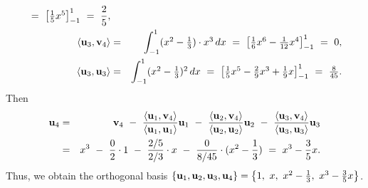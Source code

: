 \begin{solution}
\begin{eqnarray*}
    ~=~ \bigbracket{\textstyle\frac{1}{5}x^5}_{-1}^{1}
    ~=~ \frac{2}{5},
    \\
    \iprod{\vect{u}_3,\vect{v}_4}
    &=& \int_{-1}^{1}\textstyle (x^2-\frac{1}{3})\cdot x^3\,dx
    ~=~ \bigbracket{\textstyle\frac{1}{6}x^6 - \frac{1}{12}x^4}_{-1}^{1}
    ~=~ 0,
    \\
    \iprod{\vect{u}_3,\vect{u}_3}
    &=& \int_{-1}^{1}\textstyle (x^2-\frac{1}{3})^2\,dx
    ~=~ \bigbracket{\textstyle\frac{1}{5}x^5-\frac{2}{9}x^3+\frac{1}{9}x}_{-1}^{1}
    ~=~ \frac{8}{45}.
  \end{eqnarray*}
  Then
  \begin{eqnarray*}
    \vect{u}_4
    &=& \vect{v}_4
        ~-~ \frac{\iprod{\vect{u}_1,\vect{v}_4}}{\iprod{\vect{u}_1,\vect{u}_1}}\vect{u}_1
        ~-~ \frac{\iprod{\vect{u}_2,\vect{v}_4}}{\iprod{\vect{u}_2,\vect{u}_2}}\vect{u}_2
        ~-~ \frac{\iprod{\vect{u}_3,\vect{v}_4}}{\iprod{\vect{u}_3,\vect{u}_3}}\vect{u}_3
    \\
    &=& x^3 ~-~ \frac{0}{2}\cdot 1 ~-~ \frac{2/5}{2/3}\cdot x ~-~ \frac{0}{8/45}\cdot(x^2-\frac{1}{3})
        ~=~ x^3 - \frac{3}{5}x.
  \end{eqnarray*}
  Thus, we obtain the orthogonal basis $\set{\vect{u}_1,\vect{u}_2,\vect{u}_3,\vect{u}_4} =
  \set{1,~ x,~ x^2-\frac{1}{3},~ x^3 - \frac{3}{5}x}$.
\end{solution}

